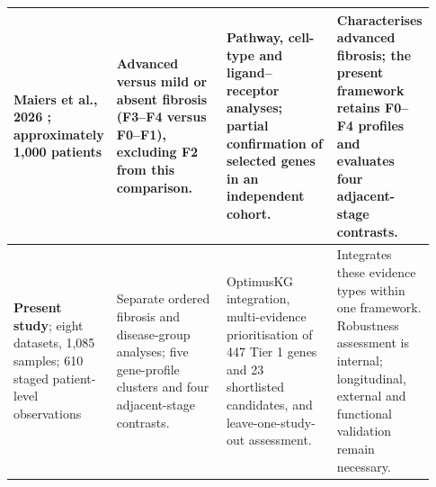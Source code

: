 \begin{longtable}{@{}>{\raggedright\arraybackslash}p{0.16\linewidth}>{\raggedright\arraybackslash}p{0.27\linewidth}>{\raggedright\arraybackslash}p{0.27\linewidth}>{\raggedright\arraybackslash}p{0.23\linewidth}@{}}
\addlinespace
Maiers et al., 2026 \cite{maiers2026}; approximately 1,000 patients & Advanced versus mild or absent fibrosis (F3--F4 versus F0--F1), excluding F2 from this comparison. & Pathway, cell-type and ligand--receptor analyses; partial confirmation of selected genes in an independent cohort. & Characterises advanced fibrosis; the present framework retains F0--F4 profiles and evaluates four adjacent-stage contrasts. \\
\midrule
\textbf{Present study}; eight datasets, 1,085 samples; 610 staged patient-level observations & Separate ordered fibrosis and disease-group analyses; five gene-profile clusters and four adjacent-stage contrasts. & OptimusKG integration, multi-evidence prioritisation of 447 Tier 1 genes and 23 shortlisted candidates, and leave-one-study-out assessment. & Integrates these evidence types within one framework. Robustness assessment is internal; longitudinal, external and functional validation remain necessary. \\
\end{longtable}
\endgroup

